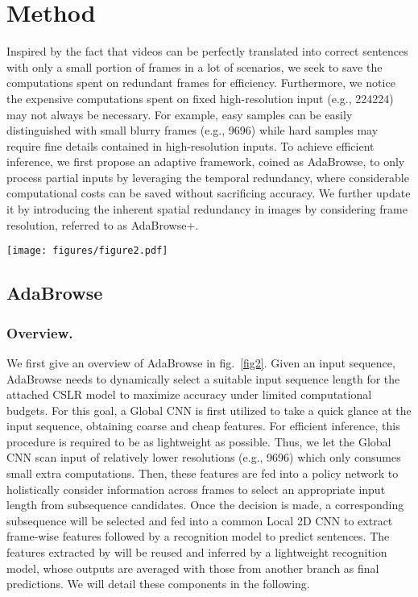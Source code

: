 \documentclass[sigconf]{acmart}
\begin{document}
\section{Method}
Inspired by the fact that videos can be perfectly translated into correct sentences with only a small portion of frames in a lot of scenarios, we seek to save the computations spent on redundant frames for efficiency. Furthermore, we notice the expensive computations spent on fixed high-resolution input (e.g., 224224) may not always be necessary. For example, easy samples can be easily distinguished with small blurry frames (e.g., 9696) while hard samples may require fine details contained in high-resolution inputs. To achieve efficient inference, we first propose an adaptive framework, coined as AdaBrowse, to only process partial inputs by leveraging the temporal redundancy, where considerable computational costs can be saved without sacrificing accuracy. We further update it by introducing the inherent spatial redundancy in images by considering frame resolution, referred to as AdaBrowse+.   
  


  \begin{figure*}[t]
    \centering
    \texttt{[image: figures/figure2.pdf]} 
    \caption{An overview for AdaBrowse. A lightweight Global CNN  is first employed to extract coarse features. These features are then sent into a policy network  to select a target subsequence which is finally inferred by an attached recognition model. Features extracted by  are reused and inferred by another lightweight recognition model and outputs from two branches are averaged as final predictions.}
    \label{fig2}
  \end{figure*}
    
\subsection{AdaBrowse}
\subsubsection{Overview.} We first give an overview of AdaBrowse in fig.~\ref{fig2}. Given an input sequence, AdaBrowse needs to dynamically select a suitable input sequence length for the attached CSLR model to maximize accuracy under limited computational budgets. For this goal, a Global CNN  is first utilized to take a quick glance at the input sequence, obtaining coarse and cheap features. For efficient inference, this procedure is required to be as lightweight as possible. Thus, we let the Global CNN  scan input of relatively lower resolutions (e.g., 9696) which only consumes small extra computations. Then, these features are fed into a policy network  to holistically consider information across frames to select an appropriate input length from  subsequence candidates. Once the decision is made, a corresponding subsequence will be selected and fed into a common Local 2D CNN  to extract frame-wise features followed by a recognition model to predict sentences. The features extracted by  will be reused and inferred by a lightweight recognition model, whose outputs are averaged with those from another branch as final predictions. We will detail these components in the following.
\end{document}
